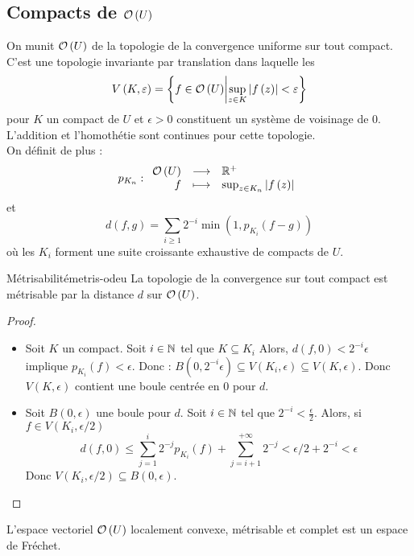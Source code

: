 \documentclass{cours}
\begin{document}
\subsection[Compacts de O(U)]{Compacts de $\mathcal{O}\left(U\right)$}
On munit $\mathcal{O}\left(U\right)$ de la topologie de la convergence uniforme sur tout compact. C'est une topologie invariante par translation dans laquelle les 
\begin{equation*}
    V\left(K, \varepsilon\right) = \left\{f \in \mathcal{O}\left(U\right)\middle| \sup\limits_{z \in K}\left|f\left(z\right)\right| < \varepsilon\right\}
\end{equation*}
pour $K$ un compact de $U$ et $\epsilon>0$ constituent un système de voisinage de $0$. L'addition et l'homothétie sont continues pour cette topologie. \\
On définit de plus :
\begin{equation*}
    p_{K_{n}} : \begin{array}{rcl}
        \mathcal{O}\left(U\right) & \longrightarrow & \mathbb{R}^{+}\\
        f & \longmapsto & \sup_{z \in K_{n}}\left|f\left(z\right)\right|
    \end{array}
\end{equation*}
et 
\begin{equation*}
    d\left(f, g\right) = \sum_{i \geq 1}2^{-i}\min\left(1, p_{K_{i}}\left(f - g\right)\right)
\end{equation*}
où les $K_{i}$ forment une suite croissante exhaustive de compacts de $U$. 
\begin{lemme}{Métrisabilité}{metris-odeu}
    La topologie de la convergence sur tout compact est métrisable par la distance $d$ sur $\mathcal{O}\left(U\right)$.
\end{lemme}
\begin{proof}
    \begin{itemize}
        \item Soit $K$ un compact. Soit $i \in \mathbb{N}$ tel que $K \subseteq K_{i}$ Alors, $d\left(f, 0\right) < 2^{-i} \epsilon$ implique $p_{K_{i}}\left(f\right) < \epsilon$. Donc : $B\left(0, 2^{-i}\epsilon\right) \subseteq V\left(K_{i}, \epsilon\right) \subseteq V\left(K, \epsilon\right)$. Donc $V\left(K, \epsilon\right)$ contient une boule centrée en $0$ pour $d$. 
        \item Soit $B\left(0, \epsilon\right)$ une boule pour $d$. Soit $i \in \mathbb{N}$ tel que $2^{-i} < \frac{\epsilon}{2}$. Alors, si $f \in V\left(K_{i}, \epsilon/2\right)$
        \begin{equation*}
            d\left(f, 0\right) \leq \sum_{j = 1}^{i}2^{-j}p_{K_{i}}\left(f\right) + \sum_{j = i + 1}^{+\infty}2^{-j} < \epsilon/2 + 2^{-i} < \epsilon
        \end{equation*}
        Donc $V\left(K_{i}, \epsilon/2\right) \subseteq B\left(0, \epsilon\right)$.
    \end{itemize}
\end{proof}
L'espace vectoriel $\mathcal{O}\left(U\right)$ localement convexe, métrisable et complet est un espace de Fréchet. 
\end{document}

